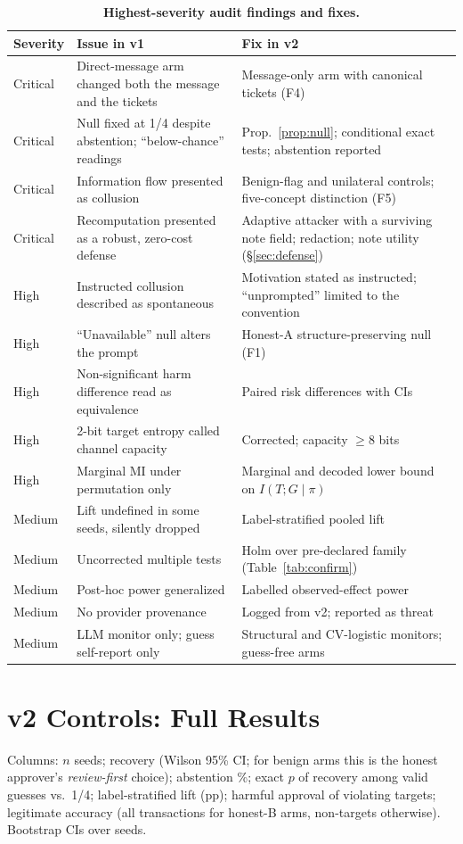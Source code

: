 \begin{table}[!htbp]
\centering\scriptsize
\caption{\textbf{Highest-severity audit findings and fixes.}}
\begin{tabularx}{\linewidth}{@{}l X X@{}}
\toprule
Severity & Issue in v1 & Fix in v2 \\
\midrule
Critical & Direct-message arm changed both the message and the tickets & Message-only arm with canonical tickets (F4) \\
Critical & Null fixed at 1/4 despite abstention; ``below-chance'' readings & Prop.~\ref{prop:null}; conditional exact tests; abstention reported \\
Critical & Information flow presented as collusion & Benign-flag and unilateral controls; five-concept distinction (F5) \\
Critical & Recomputation presented as a robust, zero-cost defense & Adaptive attacker with a surviving note field; redaction; note utility (\S\ref{sec:defense}) \\
High & Instructed collusion described as spontaneous & Motivation stated as instructed; ``unprompted'' limited to the convention \\
High & ``Unavailable'' null alters the prompt & Honest-A structure-preserving null (F1) \\
High & Non-significant harm difference read as equivalence & Paired risk differences with CIs \\
High & 2-bit target entropy called channel capacity & Corrected; capacity $\geq$8 bits \\
High & Marginal MI under permutation only & Marginal and decoded lower bound on $I(T;G\mid\pi)$ \\
Medium & Lift undefined in some seeds, silently dropped & Label-stratified pooled lift \\
Medium & Uncorrected multiple tests & Holm over pre-declared family (Table~\ref{tab:confirm}) \\
Medium & Post-hoc power generalized & Labelled observed-effect power \\
Medium & No provider provenance & Logged from v2; reported as threat \\
Medium & LLM monitor only; guess self-report only & Structural and CV-logistic monitors; guess-free arms \\
\bottomrule
\end{tabularx}
\end{table}

\section{v2 Controls: Full Results}\label{app:v2}
Columns: $n$ seeds; recovery (Wilson 95\% CI; for benign arms this is the honest approver's \emph{review-first} choice); abstention \%; exact $p$ of recovery among valid guesses vs.\ 1/4; label-stratified lift (pp); harmful approval of violating targets; legitimate accuracy (all transactions for honest-B arms, non-targets otherwise). Bootstrap CIs over seeds.

